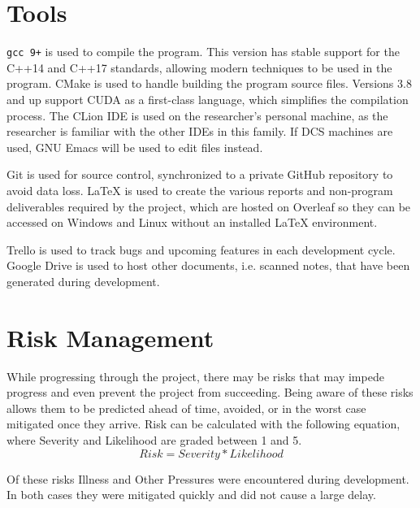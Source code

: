 \section{Tools}
\label{sec:ProjManagementTools}
\verb|gcc 9+|\cite{tool:Gcc9} is used to compile the program.
This version has stable support for the C++14 and C++17 standards\cite{tool:GccCxxStatus}, allowing modern techniques to be used in the program.
CMake\cite{tool:Cmake} is used to handle building the program source files.
Versions 3.8 and up support CUDA as a first-class language\cite{tool:CmakeCUDAFirstClass}, which simplifies the compilation process.
The CLion IDE\cite{tool:CLion} is used on the researcher's personal machine, as the researcher is familiar with the other IDEs in this family.
If DCS machines are used, GNU Emacs\cite{tool:Emacs} will be used to edit files instead.

Git\cite{tool:Git} is used for source control, synchronized to a private GitHub\cite{tool:GitHub} repository to avoid data loss.
\LaTeX{}\cite{tool:Latex} is used to create the various reports and non-program deliverables required by the project, which are hosted on Overleaf\cite{tool:Overleaf} so they can be accessed on Windows and Linux without an installed \LaTeX{} environment.
 
Trello\cite{tool:Trello} is used to track bugs and upcoming features in each development cycle.
Google Drive\cite{tool:GoogleDrive} is used to host other documents, i.e. scanned notes, that have been generated during development.

\section{Risk Management}
While progressing through the project, there may be risks that may impede progress and even prevent the project from succeeding.
Being aware of these risks allows them to be predicted ahead of time, avoided, or in the worst case mitigated once they arrive.
Risk can be calculated with the following equation, where Severity and Likelihood are graded between 1 and 5.
\begin{equation*}
    Risk = Severity * Likelihood
\end{equation*}

Of these risks Illness and Other Pressures were encountered during development.
In both cases they were mitigated quickly and did not cause a large delay.

